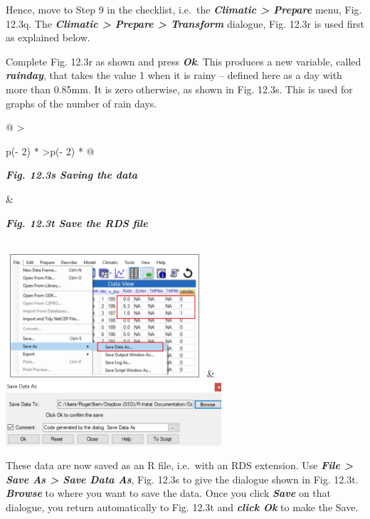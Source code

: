 \documentclass[
  letterpaper,
  DIV=11,
  numbers=noendperiod]{scrreprt}
\begin{document}
Hence, move to Step 9 in the checklist, i.e.~the \textbf{\emph{Climatic
\textgreater{} Prepare}} menu, Fig. 12.3q. The \textbf{\emph{Climatic
\textgreater{} Prepare \textgreater{} Transform}} dialogue, Fig. 12.3r
is used first as explained below.

Complete Fig. 12.3r as shown and press \textbf{\emph{Ok}}. This produces
a new variable, called \textbf{\emph{rainday}}, that takes the value 1
when it is rainy -- defined here as a day with more than 0.85mm. It is
zero otherwise, as shown in Fig. 12.3s. This is used for graphs of the
number of rain days.

\begin{longtable}[]{@{}
  >{\raggedright\arraybackslash}p{(\columnwidth - 2\tabcolsep) * }
  >{\centering\arraybackslash}p{(\columnwidth - 2\tabcolsep) * }@{}}
\toprule\noalign{}
\begin{minipage}[b]{\linewidth}\raggedright
\textbf{\emph{Fig. 12.3s Saving the data}}
\end{minipage} & \begin{minipage}[b]{\linewidth}\centering
\textbf{\emph{Fig. 12.3t Save the RDS file}}
\end{minipage} \\
\midrule\noalign{}
\endhead
\bottomrule\noalign{}
\endlastfoot
\includegraphics[width=2.8975in,height=1.80404in]{figures/Fig12.3s.png}
&
\includegraphics[width=3.15395in,height=0.94913in]{figures/Fig12.3t.png} \\
\end{longtable}

These data are now saved as an R file, i.e.~with an RDS extension. Use
\textbf{\emph{File \textgreater{} Save As \textgreater{} Save Data As}},
Fig. 12.3s to give the dialogue shown in Fig. 12.3t.
\textbf{\emph{Browse}} to where you want to save the data. Once you
click \textbf{\emph{Save}} on that dialogue, you return automatically to
Fig. 12.3t and \textbf{\emph{click Ok}} to make the Save.
\end{document}
